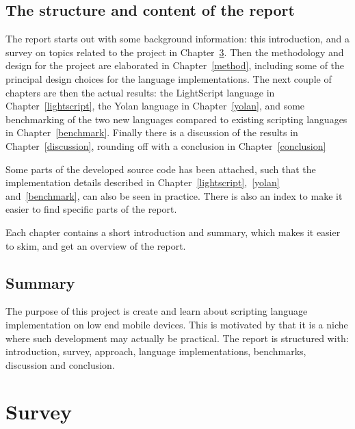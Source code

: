 \documentclass[11pt]{report}
\begin{document}
\begin{comment}
From a personal point of view, 
I would like to get started on development for mobile devices, 
and would also like to brush up on programming language implementation.
Design and implementation of a scripting language for mobile devices is spot on this topic.
\end{comment}


\section{The structure and content of the report}

The report starts out with some background information: this introduction, and a survey on topics related to the project in Chapter~\ref{survey}.
Then the methodology and design for the project are elaborated in Chapter~\ref{method}, including some of the principal design choices for the language implementations.
The next couple of chapters are then the actual results: the LightScript language in Chapter~\ref{lightscript}, the Yolan language in Chapter~\ref{yolan}, and some benchmarking of the two new languages compared to existing scripting languages in Chapter~\ref{benchmark}.
Finally there is a discussion of the results in Chapter~\ref{discussion}, rounding off with a conclusion in Chapter~\ref{conclusion}

Some parts of the developed source code has been attached, such that the implementation details described in Chapter~\ref{lightscript},~\ref{yolan} and~\ref{benchmark}, can also be seen in practice.
There is also an index to make it easier to find specific parts of the report.

Each chapter contains a short introduction and summary, which makes it easier to skim, and get an overview of the report.

\section{Summary}
The purpose of this project is create and learn about scripting language implementation on low end mobile devices.
This is motivated by that it is a niche where such development may actually be practical.
The report is structured with: introduction, survey, approach, language implementations, benchmarks, discussion and conclusion.

\chapter{Survey}
\label{survey}
\end{document}
